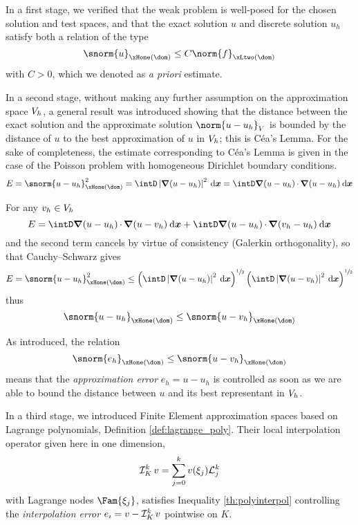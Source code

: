 \medskip
In a first stage, we verified that the weak problem is well-posed for the chosen solution and test spaces, and that the exact solution $u$ and discrete solution $u_h$ satisfy both a relation of the type
\begin{equation*}
\snorm{u}_{\xHone(\dom)} \leq C \norm{f}_{\xLtwo(\dom)}
\end{equation*}
with $C > 0$, which we denoted as \textit{a priori} estimate.

\medskip
In a second stage, without making any further assumption on the approximation space ${{V}}_h$, a general result was introduced showing that the distance between the exact solution and the approximate solution $\norm{u - u_h}_{\xV}$ is bounded by the distance of $u$ to the best approximation of $u$ in ${{V}}_h$; this is Céa's Lemma.
For the sake of completeness, the estimate corresponding to Céa's Lemma is given in the case of the Poisson problem with homogeneous Dirichlet boundary conditions.
\begin{equation*}
E = \snorm{u - u_h}^2_{\xHone(\dom)} = \intD \Abs{\Grad(u - u_h)}^2\dxx = \intD \Grad(u - u_h)\xDot\Grad(u - u_h) \dxx
\end{equation*}

For any $v_h\in{{V}}_h$
\begin{equation*}
E = \intD \Grad(u - u_h)\xDot\Grad(u - v_h) \dxx + \intD \Grad(u - u_h)\xDot\Grad(v_h - u_h) \dxx
\end{equation*}
and the second term cancels by virtue of consistency (Galerkin orthogonality), so that Cauchy--Schwarz gives
\begin{equation*}
E = \snorm{u - u_h}^2_{\xHone(\dom)} \leq \left(\intD \Abs{\Grad(u - u_h)}^2 \dxx\right)^{\sfrac{1}{2}} \left(\intD \Abs{\Grad(u - v_h)}^2 \dxx\right)^{\sfrac{1}{2}}
\end{equation*}
thus
\begin{equation*}
\snorm{u - u_h}_{\xHone(\dom)} \leq \snorm{u - v_h}_{\xHone(\dom)}
\end{equation*}


As introduced, the relation
\begin{equation}\label{eq:error_estimate_h1}
\snorm{e_h}_{\xHone(\dom)} \leq \snorm{u - v_h}_{\xHone(\dom)}
\end{equation}
means that the \textit{approximation error} $e_h = u - u_h$ is controlled as soon as we are able to bound the distance between $u$ and its best representant in ${{V}}_h$.

\medskip
In a third stage, we introduced Finite Element approximation spaces based on Lagrange polynomials, Definition \ref{def:lagrange_poly}.
Their local interpolation operator given here in one dimension,
\begin{equation*}
\mathop{\mathcal{I}_{K}^{k}} v = \sum_{j=0}^k v(\xi_j) \mathcal L^{k}_{j}
\end{equation*}
with Lagrange nodes $\Fam{\xi_j}$, satisfies Inequality \eqref{th:polyinterpol} controlling the \textit{interpolation error} $e_\imath = v - \mathop{\mathcal{I}_{K}^{k}} v$ pointwise on $K$.


